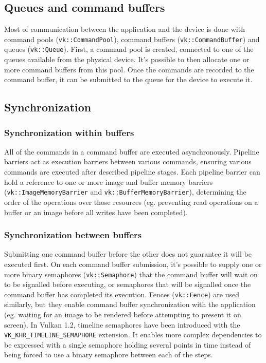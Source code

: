 \documentclass[times, utf8, zavrsni, numeric]{fer}
\begin{document}
\subsection{Queues and command buffers}
Most of communication between the application and the device is done with command pools (\texttt{vk::CommandPool}), command buffers (\texttt{vk::CommandBuffer}) and queues (\texttt{vk::Queue}). First, a command pool is created, connected to one of the queues available from the physical device. It's possible to then allocate one or more command buffers from this pool. Once the commands are recorded to the command buffer, it can be submitted to the queue for the device to execute it.

\subsection{Synchronization}
\subsubsection{Synchronization within buffers}
All of the commands in a command buffer are executed asynchronously. Pipeline barriers act as execution barriers between various commands, ensuring various commands are executed after described pipeline stages. Each pipeline barrier can hold a reference to one or more image and buffer memory barriers (\texttt{vk::ImageMemoryBarrier} and \texttt{vk::BufferMemoryBarrier}), determining the order of the operations over those resources (eg. preventing read operations on a buffer or an image before all writes have been completed).

\subsubsection{Synchronization between buffers}
Submitting one command buffer before the other does not guarantee it will be executed first. On each command buffer submission, it's possible to supply one or more binary semaphores (\texttt{vk::Semaphore}) that the command buffer will wait on to be signalled before executing, or semaphores that will be signalled once the command buffer has completed its execution. Fences (\texttt{vk::Fence}) are used similarly, but they enable command buffer synchronization with the application (eg. waiting for an image to be rendered before attempting to present it on screen). In Vulkan 1.2, timeline semaphores have been introduced with the \texttt{VK\_KHR\_TIMELINE\_SEMAPHORE} extension. It enables more complex dependencies to be expressed with a single semaphore holding several points in time instead of being forced to use a binary semaphore between each of the steps.
\end{document}
